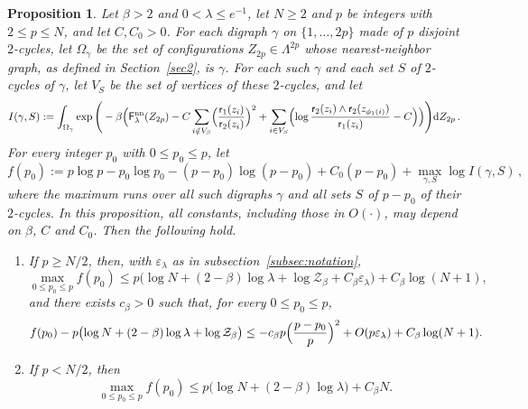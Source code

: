 \documentclass[a4paper,10pt,leqno]{amsart}
\numberwithin{equation}{section}
\newtheorem{prop}{Proposition}[section]
\newcommand{\dd}{\mathrm{d}}
\def\mc{\mathcal}
\def\F{\mathsf{F}}
\def\rr{\mathsf{r}}
\def\nn{\mathrm{nn}}
\begin{document}
\begin{prop}\label{prop:isolated}
  Let $\beta>2$ and $0<\lambda\le e^{-1}$, let $N\ge2$ and $p$ be integers with $2\le p\le N$, and let $C,C_0>0$. For each digraph $\gamma$ on $\{1,\ldots,2p\}$ made of $p$ disjoint $2$-cycles, let $\Omega_\gamma$ be the set of configurations $Z_{2p}\in\Lambda^{2p}$ whose nearest-neighbor graph, as defined in Section~\ref{sec2}, is $\gamma$. For each such $\gamma$ and each set $S$ of $2$-cycles of $\gamma$, let $V_S$ be the set of vertices of these $2$-cycles, and let
  \begin{equation*}
    I(\gamma,S):=\int_{\Omega_\gamma}\exp\Bigg(-\beta\Bigl(\F_\lambda^{\nn}(Z_{2p})-C\sum_{i\notin V_S}\Bigl(\frac{\rr_1(z_i)}{\rr_2(z_i)}\Bigr)^2+\sum_{i\in V_S}\Bigl(\log\frac{\rr_2(z_i)\wedge\rr_2(z_{\phi_1(i)})}{\rr_1(z_i)}-C\Bigr)\Bigr)\Bigg)\dd Z_{2p}\,.
  \end{equation*}
  For every integer $p_0$ with $0\le p_0\le p$, let
  \begin{equation*}
    f(p_0):=p\log p-p_0\log p_0-(p-p_0)\log(p-p_0)+C_0(p-p_0)+\max_{\gamma,S}\log I(\gamma,S)\,,
  \end{equation*}
  where the maximum runs over all such digraphs $\gamma$ and all sets $S$ of $p-p_0$ of their $2$-cycles. In this proposition, all constants, including those in $O(\cdot)$, may depend on $\beta$, $C$ and $C_0$. Then the following hold.
  \begin{enumerate}
    \item If $p\ge N/2$, then, with $\varepsilon_\lambda$ as in subsection~\ref{subsec:notation},
  \begin{equation}\label{eq:n neutral}
    \max_{0\le p_0\le p} f(p_0)
    \leq
    p\bigl( \log N +(2-\beta)\log\lambda+\log\mc{Z}_\beta+C_\beta\varepsilon_\lambda\bigr)+C_\beta\log(N+1),
  \end{equation}
  and there exists $c_\beta>0$ such that, for every $0\le p_0\le p$,
  \begin{equation}\label{eq:n neutral conv}
    f(p_0)-p\bigl( \log N +(2-\beta)\log\lambda+\log\mc{Z}_\beta\bigr) \leq -c_\beta p \Bigl(\frac{p-p_0}{p}\Bigr)^2+O(p\varepsilon_\lambda)+C_\beta\log(N+1).
  \end{equation}
    \item If $p<N/2$, then
  \begin{equation}\label{eq:crude}
    \max_{0\le p_0\le p}f(p_0)
    \leq
    p\bigl(\log N+(2-\beta)\log\lambda\bigr)+C_\beta N.
  \end{equation}
  \end{enumerate}
\end{prop}
\medskip
\end{document}
